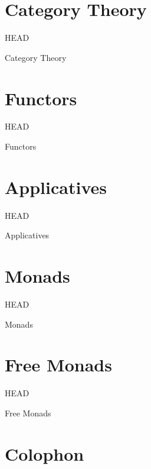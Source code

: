 \documentclass[utf8x,notes,17pt]{beamer}
\newcommand{\head}[1]{\begin{center}
\vspace{13mm}\hspace{-1mm}\Huge{{#1}}
\end{center}}
\begin{document}
\section{Category Theory}
\label{sec-13}
\begin{frame}[fragile,plain,label=sec-13-1]{HEAD}
\head{Category Theory}
\end{frame}
\section{Functors}
\label{sec-14}
\begin{frame}[fragile,plain,label=sec-14-1]{HEAD}
\head{Functors}
\end{frame}
\section{Applicatives}
\label{sec-15}
\begin{frame}[fragile,plain,label=sec-15-1]{HEAD}
\head{Applicatives}
\end{frame}
\section{Monads}
\label{sec-16}
\begin{frame}[fragile,plain,label=sec-16-1]{HEAD}
\head{Monads}
\end{frame}
\section{Free Monads}
\label{sec-17}
\begin{frame}[fragile,plain,label=sec-17-1]{HEAD}
\head{Free Monads}
\end{frame}
\section{Colophon}
\label{sec-18}
\end{document}
